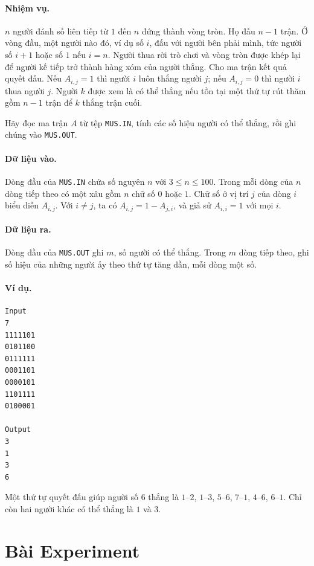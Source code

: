 \documentclass[11pt]{article}
\begin{document}
\paragraph{Nhiệm vụ.}
$n$ người đánh số liên tiếp từ $1$ đến $n$ đứng thành vòng tròn. Họ đấu
$n-1$ trận. Ở vòng đầu, một người nào đó, ví dụ số $i$, đấu với người bên phải
mình, tức người số $i+1$ hoặc số $1$ nếu $i=n$. Người thua rời trò chơi và
vòng tròn được khép lại để người kế tiếp trở thành hàng xóm của người thắng.
Cho ma trận kết quả quyết đấu. Nếu $A_{i,j}=1$ thì người $i$ luôn thắng người
$j$; nếu $A_{i,j}=0$ thì người $i$ thua người $j$. Người $k$ được xem là có
thể thắng nếu tồn tại một thứ tự rút thăm gồm $n-1$ trận để $k$ thắng trận
cuối.

Hãy đọc ma trận $A$ từ tệp \texttt{MUS.IN}, tính các số hiệu người có thể
thắng, rồi ghi chúng vào \texttt{MUS.OUT}.

\paragraph{Dữ liệu vào.}
Dòng đầu của \texttt{MUS.IN} chứa số nguyên $n$ với $3\le n\le 100$. Trong
mỗi dòng của $n$ dòng tiếp theo có một xâu gồm $n$ chữ số $0$ hoặc $1$. Chữ
số ở vị trí $j$ của dòng $i$ biểu diễn $A_{i,j}$. Với $i\ne j$, ta có
$A_{i,j}=1-A_{j,i}$, và giả sử $A_{i,i}=1$ với mọi $i$.

\paragraph{Dữ liệu ra.}
Dòng đầu của \texttt{MUS.OUT} ghi $m$, số người có thể thắng. Trong $m$ dòng
tiếp theo, ghi số hiệu của những người ấy theo thứ tự tăng dần, mỗi dòng một
số.

\paragraph{Ví dụ.}
\begin{verbatim}
Input
7
1111101
0101100
0111111
0001101
0000101
1101111
0100001

Output
3
1
3
6
\end{verbatim}
Một thứ tự quyết đấu giúp người số $6$ thắng là
$1$--$2$, $1$--$3$, $5$--$6$, $7$--$1$, $4$--$6$, $6$--$1$. Chỉ còn hai người
khác có thể thắng là $1$ và $3$.

\section{Bài Experiment}
\end{document}
